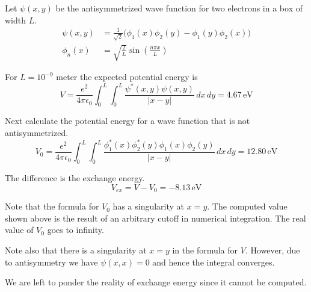 \documentclass[12pt]{article}
\begin{document}
\noindent
Let $\psi(x,y)$ be the antisymmetrized wave function for two electrons in a box of width $L$.
\begin{align*}
\psi(x,y)&=\frac{1}{\sqrt{2}}
\big(\phi_1(x)\phi_2(y)-\phi_1(y)\phi_2(x)\big)
\\[2ex]
\phi_n(x)&=\sqrt{\frac{2}{L}}\sin\left(\frac{n\pi x}{L}\right)
\end{align*}

\noindent
For $L=10^{-9}$ meter the expected potential energy is
\begin{equation*}
V=\frac{e^2}{4\pi\epsilon_0}\int_0^L\int_0^L\frac{\psi^*(x,y)\psi(x,y)}{|x-y|}\,dx\,dy
=4.67\,\text{eV}
\end{equation*}

\noindent
Next calculate the potential energy for a wave function that is not antisymmetrized.
\begin{equation*}
V_0=\frac{e^2}{4\pi\epsilon_0}
\int_0^L\int_0^L\frac{\phi_1^*(x)\phi_2^*(y)\phi_1(x)\phi_2(y)}{|x-y|}\,dx\,dy
=12.80\,\text{eV}
\end{equation*}

\noindent
The difference is the exchange energy.
\begin{equation*}
V_{ex}=V-V_0=-8.13\,\text{eV}
\end{equation*}

\noindent
Note that the formula for $V_0$ has a singularity at $x=y$.
The computed value shown above is the result of an arbitrary cutoff in numerical integration.
The real value of $V_0$ goes to infinity.

\bigskip
\noindent
Note also that there is a singularity at $x=y$ in the formula for $V$.
However, due to antisymmetry we have $\psi(x,x)=0$ and hence the integral converges.

\bigskip
\noindent
We are left to ponder the reality of exchange energy since it cannot be computed.
\end{document}
